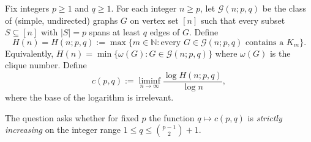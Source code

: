 Fix integers $p\ge 1$ and $q\ge 1$.
For each integer $n\ge p$, let $\mathcal{G}(n;p,q)$ be the class of (simple, undirected) graphs $G$ on vertex set $[n]$ such that every subset $S\subseteq [n]$ with $|S|=p$ spans at least $q$ edges of $G$.
Define
\[
H(n)=H(n;p,q) := \max\big\{ m\in\mathbb{N} : \text{every } G\in\mathcal{G}(n;p,q) \text{ contains a } K_m\big\}.
\]
Equivalently, $H(n)=\min\{\omega(G): G\in\mathcal{G}(n;p,q)\}$ where $\omega(G)$ is the clique number.
Define
\[
c(p,q) := \liminf_{n\to\infty} \frac{\log H(n;p,q)}{\log n},
\]
where the base of the logarithm is irrelevant.

The question asks whether for fixed $p$ the function $q\mapsto c(p,q)$ is \emph{strictly increasing} on the integer range
$1\le q\le \binom{p-1}{2}+1$.
